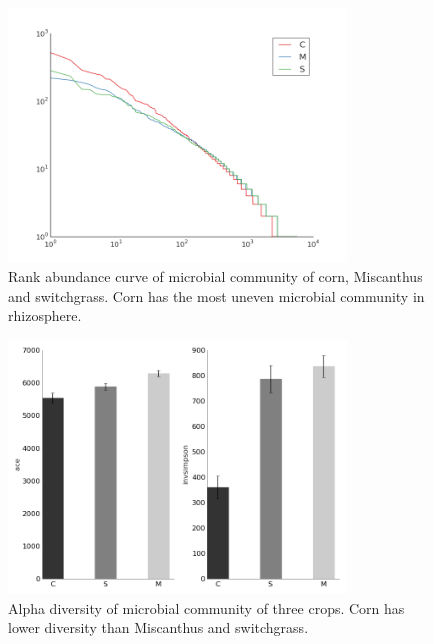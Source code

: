 \documentclass[12pt]{article}
\begin{document}
    \begin{figure}[tbph!]
    \centering
    \includegraphics[width=0.8\textwidth]{figures/otu-rankabuncurve}
    \caption[Rank abundance curve]{Rank abundance curve of microbial community of corn, Miscanthus and switchgrass. Corn has the most uneven microbial community in rhizosphere.}
    \label{fig:otu-rankabuncurve}
    \end{figure}


    \begin{figure}[tbph!]
    \centering
    \includegraphics[width=0.8\textwidth]{figures/otu-alpha-div}
    \caption[Alpha diversity]{Alpha diversity of microbial community of three crops. Corn has lower diversity than Miscanthus and switchgrass.}
    \label{fig:otu-alpha-div}
    \end{figure}
\end{document}

